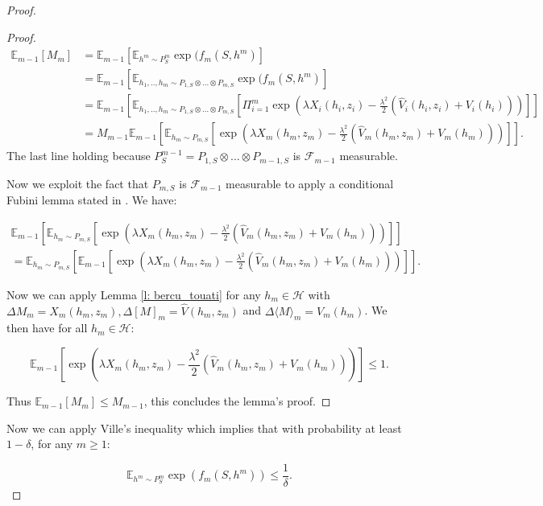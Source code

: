 \begin{proof}
\begin{proof}
     \begin{align*}
       \mathbb{E}_{m-1}[M_m]& =\mathbb{E}_{m-1}\left[\mathbb{E}_{h^m\sim P^m_S}\exp(f_m(S,h^m)\right] \\
       & = \mathbb{E}_{m-1}\left[\mathbb{E}_{h_1,..,h_m\sim P_{1,S}\otimes...\otimes P_{m,S}}\exp(f_m(S,h^m)\right] \\
       & = \mathbb{E}_{m-1}\left[\mathbb{E}_{h_1,..,h_m\sim P_{1,S}\otimes...\otimes P_{m,S}}\left[\Pi_{i=1}^m\exp\left(\lambda X_i(h_i,z_i)  - \frac{\lambda^2}{2}(\hat{V}_i(h_i,z_i) + V_i(h_i))\right)\right] \right] \\
        & = M_{m-1} \mathbb{E}_{m-1}\left[ \mathbb{E}_{h_m\sim P_{m,S}}\left[\exp\left(\lambda X_m(h_m,z_m)  - \frac{\lambda^2}{2}(\hat{V}_m(h_m,z_m) + V_m(h_m))\right) \right]\right].
     \end{align*}
 The last line holding because $P^{m-1}_S = P_{1,S}\otimes...\otimes P_{m-1,S}$ is $\mathcal{F}_{m-1}$ measurable.


   Now we exploit the fact that $P_{m,S}$ is $\mathcal{F}_{m-1}$ measurable to apply a conditional Fubini lemma stated in \citet[][Lemma D.3]{haddouche2022online}. We have:

   \begin{multline*}
     \mathbb{E}_{m-1}\left[ \mathbb{E}_{h_m\sim P_{m,S}}\left[\exp\left(\lambda X_m(h_m,z_m)  - \frac{\lambda^2}{2}(\hat{V}_m(h_m,z_m) + V_m(h_m))\right) \right]\right] \\ =  \mathbb{E}_{h_m\sim P_{m,S}}\left[\mathbb{E}_{m-1}\left[\exp\left(\lambda X_m(h_m,z_m)  - \frac{\lambda^2}{2}(\hat{V}_m(h_m,z_m) + V_m(h_m))\right) \right]\right].
   \end{multline*}

 Now we can apply Lemma \ref{l: bercu_touati} for any $h_m\in\mathcal{H}$ with $\Delta M_{m}=X_m(h_m,z_m), \Delta[M]_{m}=\hat{V}(h_m,z_m)$ and $\Delta\langle M\rangle_{m}= V_m(h_m)$. We then have for all $h_m\in\mathcal{H}$:

 \[ \mathbb{E}_{m-1}\left[\exp\left(\lambda X_m(h_m,z_m)  - \frac{\lambda^2}{2}(\hat{V}_m(h_m,z_m) + V_m(h_m))\right) \right] \leq 1.  \]

 Thus $\mathbb{E}_{m-1}[M_m] \leq M_{m-1}$, this concludes the lemma's proof.
   \end{proof}

 Now we can apply Ville's inequality which implies that with probability at least $1-\delta$, for any $m\geq 1$:

 \[ \mathbb{E}_{h^m\sim P^m_S}\exp(f_m(S,h^m)) \leq \frac{1}{\delta}. \]


\end{proof}
